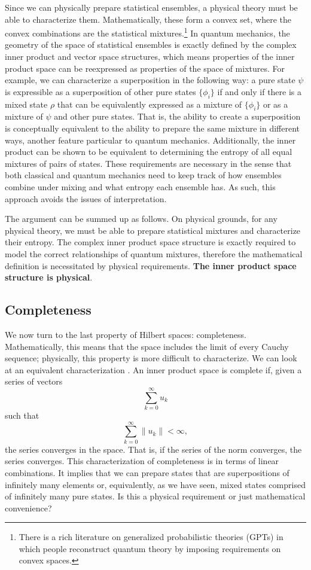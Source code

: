 \documentclass[10pt,twocolumn, nofootinbib]{revtex4-2}
\begin{document}
Since we can physically prepare statistical ensembles, a physical theory must be able to characterize them. Mathematically, these form a convex set, where the convex combinations are the statistical mixtures.\footnote{There is a rich literature on generalized probabilistic theories (GPTs) in which people reconstruct quantum theory by imposing requirements on convex spaces.\cite{gpt_overview_2021}} In quantum mechanics, the geometry of the space of statistical ensembles is exactly defined by the complex inner product and vector space structures, which means properties of the inner product space can be reexpressed as properties of the space of mixtures. For example, we can characterize a superposition in the following way: a pure state $\psi$ is expressible as a superposition of other pure states $\{\phi_i\}$ if and only if there is a mixed state $\rho$ that can be equivalently expressed as a mixture of $\{\phi_i\}$ or as a mixture of $\psi$ and other pure states. That is, the ability to create a superposition is conceptually equivalent to the ability to prepare the same mixture in different ways, another feature particular to quantum mechanics. Additionally, the inner product can be shown to be equivalent to determining the entropy of all equal mixtures of pairs of states. These requirements are necessary in the sense that both classical and quantum mechanics need to keep track of how ensembles combine under mixing and what entropy each ensemble has. As such, this approach avoids the issues of interpretation.

The argument can be summed up as follows. On physical grounds, for any physical theory, we must be able to prepare statistical mixtures and characterize their entropy. The complex inner product space structure is exactly required to model the correct relationships of quantum mixtures, therefore the mathematical definition is necessitated by physical requirements. \textbf{The inner product space structure is physical}.

\subsection{Completeness}

We now turn to the last property of Hilbert spaces: completeness. Mathematically, this means that the space includes the limit of every Cauchy sequence; physically, this property is more difficult to characterize. We can look at an equivalent characterization \cite[Theorem 13.8]{roman_2008}. An inner product space is complete if, given a series of vectors
$$ \sum _{k=0}^{\infty }u_{k}$$
such that
$$ \sum _{k=0}^{\infty }\|u_{k}\|<\infty,$$
the series converges in the space. That is, if the series of the norm converges, the series converges. This characterization of completeness is in terms of linear combinations. It implies that we can prepare states that are superpositions of infinitely many elements or, equivalently, as we have seen, mixed states comprised of infinitely many pure states. Is this a physical requirement or just mathematical convenience?
\end{document}
